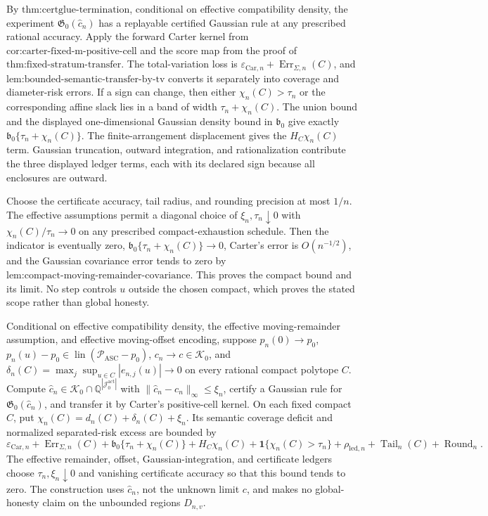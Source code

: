 By \(\text{thm:certglue-termination}\), conditional on effective compatibility density, the experiment \(\mathfrak G_0(\widehat c_n)\) has a replayable certified Gaussian rule at any prescribed rational accuracy. Apply the forward Carter kernel from \(\text{cor:carter-fixed-m-positive-cell}\) and the score map from the proof of \(\text{thm:fixed-stratum-transfer}\). The total-variation loss is
\(\varepsilon_{\mathrm{Car},n}+\operatorname{Err}_{\Sigma,n}(C)\), and \(\text{lem:bounded-semantic-transfer-by-tv}\) converts it separately into coverage and diameter-risk errors. If a sign can change, then either \(\chi_n(C)>\tau_n\) or the corresponding affine slack lies in a band of width \(\tau_n+\chi_n(C)\). The union bound and the displayed one-dimensional Gaussian density bound in \(\mathfrak b_0\) give exactly \(\mathfrak b_0\{\tau_n+\chi_n(C)\}\). The finite-arrangement displacement gives the \(H_C\chi_n(C)\) term. Gaussian truncation, outward integration, and rationalization contribute the three displayed ledger terms, each with its declared sign because all enclosures are outward.

Choose the certificate accuracy, tail radius, and rounding precision at most \(1/n\). The effective assumptions permit a diagonal choice of \(\xi_n,\tau_n\downarrow0\) with \(\chi_n(C)/\tau_n\to0\) on any prescribed compact-exhaustion schedule. Then the indicator is eventually zero, \(\mathfrak b_0\{\tau_n+\chi_n(C)\}\to0\), Carter's error is \(O(n^{-1/2})\), and the Gaussian covariance error tends to zero by \(\text{lem:compact-moving-remainder-covariance}\). This proves the compact bound and its limit. No step controls \(u\) outside the chosen compact, which proves the stated scope rather than global honesty.

Conditional on effective compatibility density, the effective moving-remainder assumption, and effective moving-offset encoding, suppose \(p_n(0)\to p_0\), \(p_n(u)-p_0\in\operatorname{lin}(\mathcal P_{\mathrm{ASC}}-p_0)\), \(c_n\to c\in\mathcal K_0\), and \(\delta_n(C)=\max_j\sup_{u\in C}|e_{n,j}(u)|\to0\) on every rational compact polytope \(C\). Compute \(\widehat c_n\in\mathcal K_0\cap\mathbb Q^{|\mathcal J_0^{\mathrm{act}}|}\) with \(\|\widehat c_n-c_n\|_\infty\le\xi_n\), certify a Gaussian rule for \(\mathfrak G_0(\widehat c_n)\), and transfer it by Carter's positive-cell kernel. On each fixed compact \(C\), put \(\chi_n(C)=d_n(C)+\delta_n(C)+\xi_n\). Its semantic coverage deficit and normalized separated-risk excess are bounded by
\[
 \varepsilon_{\mathrm{Car},n}+\operatorname{Err}_{\Sigma,n}(C)
 +\mathfrak b_0\{\tau_n+\chi_n(C)\}
 +H_C\chi_n(C)+\mathbf1\{\chi_n(C)>\tau_n\}
 +\rho_{\mathrm{led},n}+\operatorname{Tail}_n(C)+\operatorname{Round}_n.
\]
The effective remainder, offset, Gaussian-integration, and certificate ledgers choose \(\tau_n,\xi_n\downarrow0\) and vanishing certificate accuracy so that this bound tends to zero. The construction uses \(\widehat c_n\), not the unknown limit \(c\), and makes no global-honesty claim on the unbounded regions \(D_{n,v}\).

